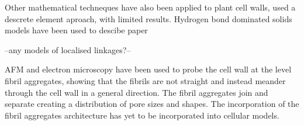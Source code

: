 Other mathematical techneques have also been applied to plant cell walls, \cite{HEPWORTH_1998} used a descrete element aproach, with limited results. Hydrogen bond dominated solids models have been used to descibe paper \cite{nissan1997link}\cite{batten1987unified}\cite{nissan1987unified}\cite{batten1987unified}

--any models of localised linkages?--

AFM and electron microscopy have been used to probe the cell wall at the level fibril aggregates, showing that the fibrils are not straight and instead meander through the cell wall in a general direction. The fibril aggregates join and separate creating a distribution of pore sizes and shapes. The incorporation of the fibril aggregates architecture has yet to be incorporated into cellular models. 